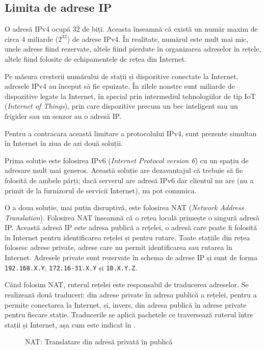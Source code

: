 \subsection{Limita de adrese IP}
\label{sec:net:tcp-ip:ip-limit}

O adresă IPv4 ocupă 32 de biți.
Aceasta înseamnă că există un număr maxim de circa 4 miliarde ($2^{32}$) de adrese IPv4.
În realitate, numărul este mult mai mic, unele adrese fiind rezervate, altele fiind pierdute în organizarea adreselor în rețele, altele fiind folosite de echipamentele de rețea din Internet.

Pe măsura creșterii numărului de stații și dispozitive conectate la Internet, adresele IPv4 au început să fie epuizate.
În zilele noastre sunt miliarde de dispozitive legate la Internet, în special prin intermediul tehnologiilor de tip IoT (\textit{Internet of Things}), prin care dispozitive precum un bec inteligent sau un frigider sau un senzor au o adresă IP.

Pentru a contracara această limitare a protocolului IPv4, sunt prezente simultan în Internet în ziua de azi două soluții.

Prima soluție este folosirea IPv6 (\textit{Internet Protocol version 6}) cu un spațiu de adresare mult mai generos.
Această soluție are dezavantajul că trebuie să fie folosită de ambele părți; dacă serverul are adresă IPv6 dar clientul nu are (nu a primit de la furnizorul de servicii Internet), nu pot comunica.

O a doua soluție, mai puțin disruptivă, este folosirea NAT (\textit{Network Address Translation}).
Folosirea NAT înseamnă că o rețea locală primește o singură adresă IP.
Această adresă IP este adresa publică a rețelei, o adresă care poate fi folosită în Internet pentru identificarea rețelei și pentru rutare.
Toate stațiile din rețea folosesc adrese private, adrese care nu permit identificarea sau rutarea în Internet.
Adresele private sunt rezervate în schema de adrese IP și sunt de forma \texttt{192.168.X.Y}, \texttt{172.16-31.X.Y} și \texttt{10.X.Y.Z}.

Când folosim NAT, ruterul rețelei este responsabil de traducerea adreselor.
Se realizează două traduceri: din adrese private în adresa publică a rețelei, pentru a permite conectarea la Internet, și, invers, din adresa publică în adrese private pentru fiecare stație.
Traducerile se aplică pachetele ce traversează ruterul între stații și Internet, așa cum este indicat în .

\begin{figure}[htbp]
  \centering
  \def\svgwidth{\columnwidth}
  
  \caption{NAT: Translatare din adresă privată în publică}
  \label{fig:net:nat}
\end{figure}

